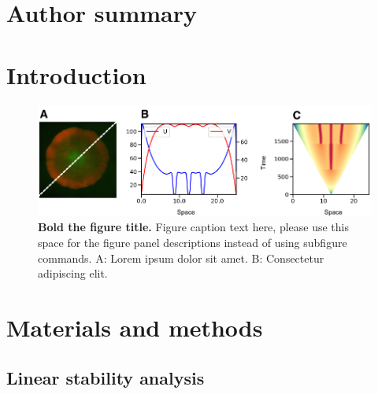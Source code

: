\documentclass[10pt,letterpaper]{article}
\begin{document}
\section*{Author summary}


\linenumbers

\section*{Introduction}


\begin{figure}[!h]
    \includegraphics[width=1\textwidth]{figures/biological_example}

    \caption{{\bf Bold the figure title.}
        Figure caption text here, please use this space for the figure panel descriptions instead of using subfigure commands. A: Lorem ipsum dolor sit amet. B: Consectetur adipiscing elit.}
    \label{fig1}
\end{figure}












\section*{Materials and methods}

\subsection*{Linear stability analysis}
\end{document}
